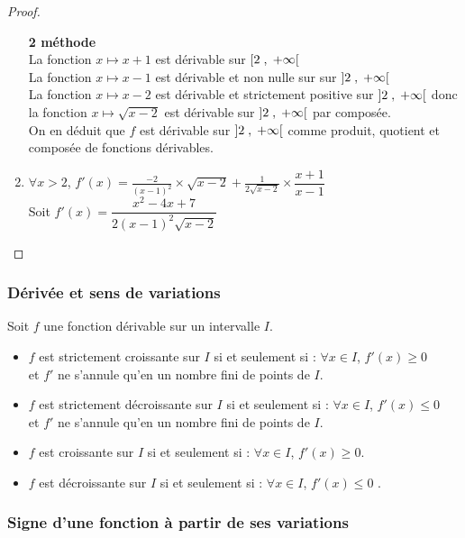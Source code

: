 \begin{proof}
\begin{enumerate}
\textbf{ 2\iere{} méthode } \\  La fonction $ x \mapsto x+1 $ est  dérivable sur $\left[2 \;,\; +\infty\right[ $ \\ La fonction $ x \mapsto x-1 $ est  dérivable et non nulle  sur sur $\left]2 \;,\; +\infty\right[ $   \\ La fonction $ x \mapsto x-2$ est  dérivable et strictement positive sur $\left]2 \;,\; +\infty\right[$ donc la fonction $ x \mapsto \sqrt{x-2} $ est   dérivable sur $\left]2 \;,\; +\infty\right[$ par composée.\\ On en déduit que $ f $ est dérivable  sur $\left]2 \;,\; +\infty\right[$ comme produit, quotient et composée de  fonctions dérivables. 

 \item $ \forall x > 2  $, $ f'(x)= \frac{-2}{(x-1)^{2}}\times \sqrt{x-2}+ \frac{1}{2\sqrt{x-2}}\times \dfrac{x+1}{x-1} $\\
Soit  $ f'(x)=\dfrac{x^{2}-4x+7}{2(x-1)^{2}\sqrt{x-2}} $
\end{enumerate}
\end{proof}
\subsubsection*{Dérivée et sens de variations}
\begin{theorem}
Soit $ f $ une fonction dérivable sur un intervalle $ I. $
\begin{itemize}
\item[\textbullet] $f$ est strictement croissante sur $I$ si et seulement si : $ ∀ x\in I$, $f '(x) ≥ 0 $ \\et $f'$ ne s'annule qu'en un nombre fini de points de $I$. 
\item[\textbullet] $f$ est strictement décroissante sur $I$ si et seulement si : $ ∀ x\in I$, $f '(x)  \leq 0 $ \\ et $f'$ ne s'annule qu'en un nombre fini de points de $I$.
\item[\textbullet] $f$ est  croissante sur $I$ si et seulement si : $ ∀ x\in I$, $f '(x) ≥ 0 $. 
\item[\textbullet] $f$ est  décroissante sur $I$ si et seulement si : $ ∀ x\in I$, $f '(x) \leq 0 $ .  
\end{itemize}
\end{theorem}
 \subsubsection*{Signe d'une fonction à partir de ses variations}


